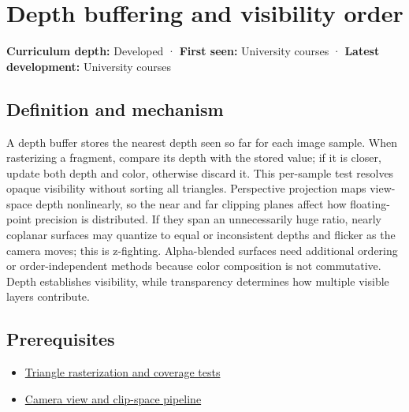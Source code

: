 \hypertarget{appendix-97578ed97952}{}\label{referencestart:appendix-97578ed97952}
\section{Depth buffering and visibility order}\label{appendix-97578ed97952-depth-buffering-and-visibility-order}

\textbf{Curriculum depth:} Developed · \textbf{First seen:} University courses · \textbf{Latest development:} University courses

\begin{allmightroledefinition}

\subsection{Definition and mechanism}\label{appendix-97578ed97952-definition-and-mechanism}

A depth buffer stores the nearest depth seen so far for each image sample. When rasterizing a fragment, compare its depth with the stored value; if it is closer, update both depth and color, otherwise discard it. This per-sample test resolves opaque visibility without sorting all triangles. Perspective projection maps view-space depth nonlinearly, so the near and far clipping planes affect how floating-point precision is distributed. If they span an unnecessarily huge ratio, nearly coplanar surfaces may quantize to equal or inconsistent depths and flicker as the camera moves; this is z-fighting. Alpha-blended surfaces need additional ordering or order-independent methods because color composition is not commutative. Depth establishes visibility, while transparency determines how multiple visible layers contribute.

\end{allmightroledefinition}

\subsection{Prerequisites}\label{appendix-97578ed97952-prerequisites}

\begin{itemize}
\tightlist
\item
  \hyperref[appendix-ed3f9bc298fe]{Triangle rasterization and coverage tests}
\item
  \hyperref[appendix-1c07d64f5e70]{Camera view and clip-space pipeline}
\end{itemize}

